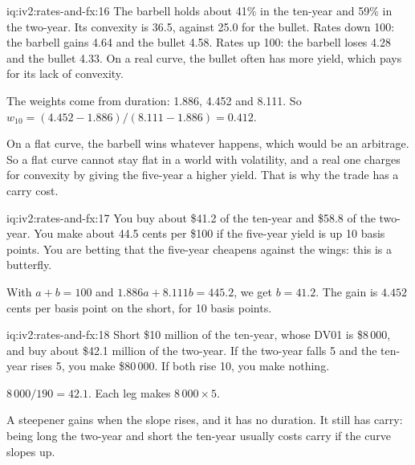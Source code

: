 \begin{solution}{iq:iv2:rates-and-fx:16}
The barbell holds about 41\% in the ten-year and 59\% in the two-year. Its convexity is 36.5, against 25.0 for the bullet. Rates down 100: the barbell gains 4.64 and the bullet 4.58. Rates up 100: the barbell loses 4.28 and the bullet 4.33. On a real curve, the bullet often has more yield, which pays for its lack of convexity.

The weights come from duration: 1.886, 4.452 and 8.111. So $w_{10} = (4.452 - 1.886)/(8.111 - 1.886) = 0.412$.

On a flat curve, the barbell wins whatever happens, which would be an arbitrage. So a flat curve cannot stay flat in a world with volatility, and a real one charges for convexity by giving the five-year a higher yield. That is why the trade has a carry cost.

\end{solution}

\begin{solution}{iq:iv2:rates-and-fx:17}
You buy about \$41.2 of the ten-year and \$58.8 of the two-year. You make about 44.5 cents per \$100 if the five-year yield is up 10 basis points. You are betting that the five-year cheapens against the wings: this is a butterfly.

With $a + b = 100$ and $1.886a + 8.111b = 445.2$, we get $b = 41.2$. The gain is $4.452$ cents per basis point on the short, for 10 basis points.

\end{solution}

\begin{solution}{iq:iv2:rates-and-fx:18}
Short \$10 million of the ten-year, whose DV01 is \$8\,000, and buy about \$42.1 million of the two-year. If the two-year falls 5 and the ten-year rises 5, you make \$80\,000. If both rise 10, you make nothing.

$8\,000/190 = 42.1$. Each leg makes $8\,000 \times 5$.

A steepener gains when the slope rises, and it has no duration. It still has carry: being long the two-year and short the ten-year usually costs carry if the curve slopes up.

\end{solution}

